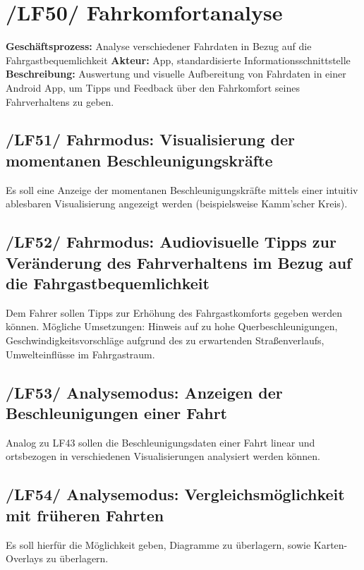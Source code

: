 \newpage
\section{/LF50/ Fahrkomfortanalyse}
\textbf{Geschäftsprozess:}	Analyse verschiedener Fahrdaten in Bezug auf die Fahrgastbequemlichkeit
\newline
\textbf{Akteur:}		App, standardisierte Informationsschnittstelle
\newline
\textbf{Beschreibung:} Auswertung und visuelle Aufbereitung von Fahrdaten in einer Android App, um Tipps und Feedback über den Fahrkomfort seines Fahrverhaltens zu geben.

\subsection{/LF51/ Fahrmodus: Visualisierung der momentanen Beschleunigungskräfte}
\newline
Es soll eine Anzeige der momentanen Beschleunigungskräfte mittels einer intuitiv ablesbaren Visualisierung angezeigt werden (beispielsweise Kamm'scher Kreis).

\subsection{/LF52/ Fahrmodus: Audiovisuelle Tipps zur Veränderung des Fahrverhaltens im Bezug auf die Fahrgastbequemlichkeit}
\newline
Dem Fahrer sollen Tipps zur Erhöhung des Fahrgastkomforts gegeben werden können. Mögliche Umsetzungen: Hinweis auf zu hohe Querbeschleunigungen, Geschwindigkeitsvorschläge aufgrund des zu erwartenden Straßenverlaufs, Umwelteinflüsse im Fahrgastraum.

\subsection{/LF53/ Analysemodus: Anzeigen der Beschleunigungen einer Fahrt}
\newline
 Analog zu LF43 sollen die Beschleunigungsdaten einer Fahrt linear und ortsbezogen in verschiedenen Visualisierungen analysiert werden können.

\subsection{/LF54/ Analysemodus: Vergleichsmöglichkeit mit früheren Fahrten}
\newline
Es soll hierfür die Möglichkeit geben, Diagramme zu überlagern, sowie Karten-Overlays zu überlagern.

